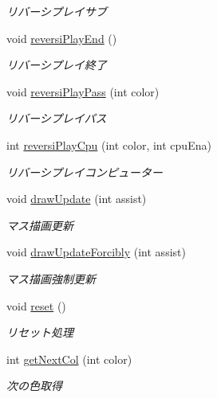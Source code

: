 \begin{DoxyCompactItemize}
\begin{DoxyCompactList}\small\item\em リバーシプレイサブ \end{DoxyCompactList}\item 
void \hyperlink{class_reversi4color_wpf_1_1_reversi_play_a870220856af57a48fc1527e59a552171}{reversi\+Play\+End} ()
\begin{DoxyCompactList}\small\item\em リバーシプレイ終了 \end{DoxyCompactList}\item 
void \hyperlink{class_reversi4color_wpf_1_1_reversi_play_ab33ac6590dea7b86e1fcc0d011353564}{reversi\+Play\+Pass} (int color)
\begin{DoxyCompactList}\small\item\em リバーシプレイパス \end{DoxyCompactList}\item 
int \hyperlink{class_reversi4color_wpf_1_1_reversi_play_a2c7daaca43563e35abf8e65347c65a23}{reversi\+Play\+Cpu} (int color, int cpu\+Ena)
\begin{DoxyCompactList}\small\item\em リバーシプレイコンピューター \end{DoxyCompactList}\item 
void \hyperlink{class_reversi4color_wpf_1_1_reversi_play_af579d0b931ddc4bb8e07f37254e08625}{draw\+Update} (int assist)
\begin{DoxyCompactList}\small\item\em マス描画更新 \end{DoxyCompactList}\item 
void \hyperlink{class_reversi4color_wpf_1_1_reversi_play_a4669f078f21525854defe55a689fe2de}{draw\+Update\+Forcibly} (int assist)
\begin{DoxyCompactList}\small\item\em マス描画強制更新 \end{DoxyCompactList}\item 
void \hyperlink{class_reversi4color_wpf_1_1_reversi_play_a37fb774e5829a4dd99d9af0ca020f912}{reset} ()
\begin{DoxyCompactList}\small\item\em リセット処理 \end{DoxyCompactList}\item 
int \hyperlink{class_reversi4color_wpf_1_1_reversi_play_a5ad5b6251ce357ddfe1540c5559b9371}{get\+Next\+Col} (int color)
\begin{DoxyCompactList}\small\item\em 次の色取得 \end{DoxyCompactList}\item 

\end{DoxyCompactItemize}
